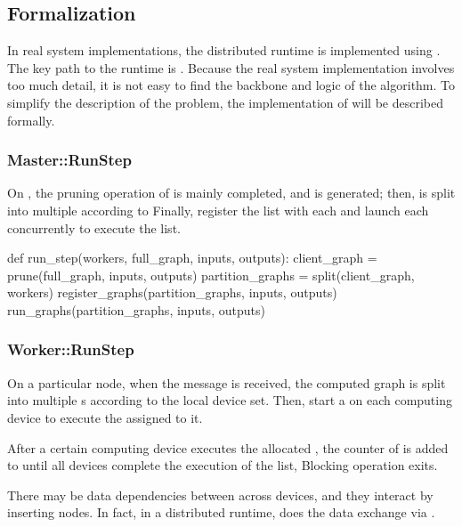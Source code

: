 \begin{content}
\subsection{Formalization}
In real system implementations, the distributed runtime is implemented using . The key path to the \tf{} runtime is . Because the real system implementation involves too much detail, it is not easy to find the backbone and logic of the algorithm. To simplify the description of the problem, the implementation of  will be described formally.


\subsubsection{Master::RunStep}
On , the pruning operation of  is mainly completed, and  is generated; then,  is split into multiple  according to  Finally, register the  list with each  and launch each  concurrently to execute the  list.

\begin{leftbar}
\begin{python}
def run_step(workers, full_graph, inputs, outputs):
  client_graph = prune(full_graph, inputs, outputs)
  partition_graphs = split(client_graph, workers)
  register_graphs(partition_graphs, inputs, outputs)
  run_graphs(partition_graphs, inputs, outputs)
\end{python}
\end{leftbar}


\subsubsection{Worker::RunStep}
On a particular  node, when the  message is received, the computed graph is split into multiple s according to the local device set. Then, start a  on each computing device to execute the  assigned to it.

After a certain computing device executes the allocated , the counter of  is added to  until all devices complete the execution of the  list,  Blocking operation exits.

There may be data dependencies between  across devices, and they interact by inserting  nodes. In fact, in a distributed runtime,  does the data exchange via .


\end{content}
